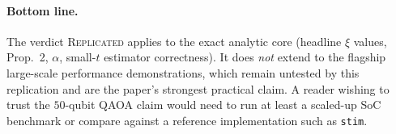 \documentclass[11pt]{article}
\begin{document}
\paragraph{Bottom line.}
The verdict \textsc{Replicated} applies to the exact analytic core (headline $\xi$
values, Prop.~2, $\alpha$, small-$t$ estimator correctness). It does \emph{not} extend
to the flagship large-scale performance demonstrations, which remain untested by this
replication and are the paper's strongest practical claim. A reader wishing to trust
the $50$-qubit QAOA claim would need to run at least a scaled-up SoC benchmark or
compare against a reference implementation such as \texttt{stim}.


\end{document}
